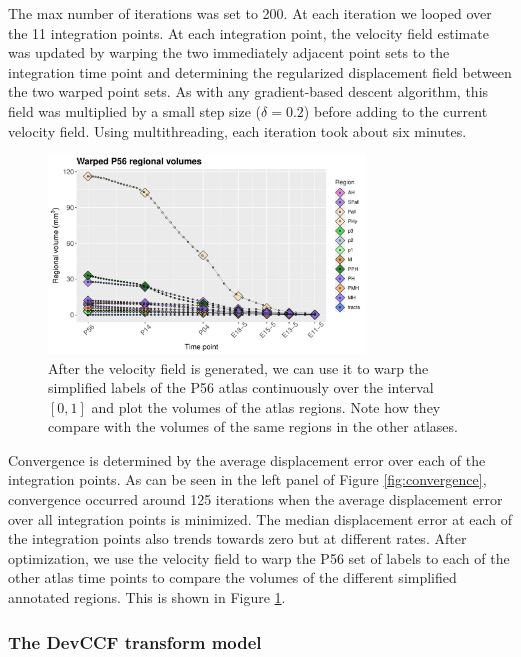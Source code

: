 \documentclass[
  12pt,
]{article}
\begin{document}
The max number of iterations was set to 200. At each iteration we looped
over the 11 integration points. At each integration point, the velocity
field estimate was updated by warping the two immediately adjacent point
sets to the integration time point and determining the regularized
displacement field between the two warped point sets. As with any
gradient-based descent algorithm, this field was multiplied by a small
step size (\(\delta = 0.2\)) before adding to the current velocity
field. Using multithreading, each iteration took about six minutes.

\begin{figure}[!htb]
\centering
\includegraphics[width=0.75\textwidth]{Figures/warpedP56Volumes.pdf}
\caption{After the velocity field is generated, we can use it to warp
the simplified labels of the P56 atlas continuously over the interval
$[0, 1]$ and plot the volumes of the atlas regions.  Note how they 
compare with the volumes of the same regions in the other atlases.}
\label{fig:warpedP56}
\end{figure}

Convergence is determined by the average displacement error over each of
the integration points. As can be seen in the left panel of Figure
\ref{fig:convergence}, convergence occurred around 125 iterations when
the average displacement error over all integration points is minimized.
The median displacement error at each of the integration points also
trends towards zero but at different rates. After optimization, we use
the velocity field to warp the P56 set of labels to each of the other
atlas time points to compare the volumes of the different simplified
annotated regions. This is shown in Figure \ref{fig:warpedP56}.

\hypertarget{the-devccf-transform-model}{%
\subsubsection*{The DevCCF transform
model}\label{the-devccf-transform-model}}
\end{document}
